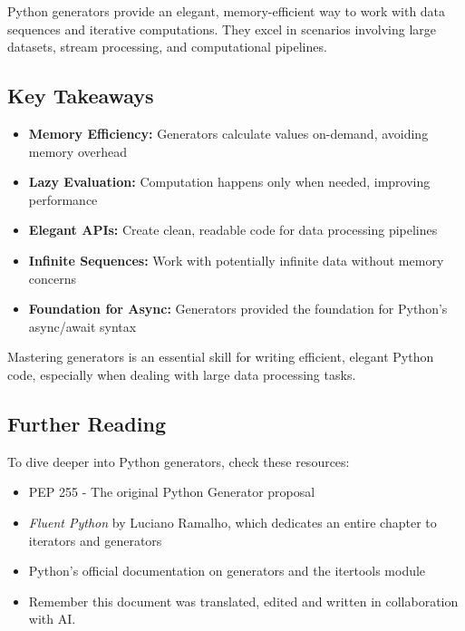 \documentclass[12pt,letterpaper]{article}
\begin{document}
Python generators provide an elegant, memory-efficient way to work with data sequences and iterative computations. They excel in scenarios involving large datasets, stream processing, and computational pipelines.

\subsection{Key Takeaways}

\begin{itemize}
    \item \textbf{\textcolor{pythonBlue}{Memory Efficiency:}} Generators calculate values on-demand, avoiding memory overhead
    \item \textbf{\textcolor{pythonBlue}{Lazy Evaluation:}} Computation happens only when needed, improving performance
    \item \textbf{\textcolor{pythonBlue}{Elegant APIs:}} Create clean, readable code for data processing pipelines
    \item \textbf{\textcolor{pythonBlue}{Infinite Sequences:}} Work with potentially infinite data without memory concerns
    \item \textbf{\textcolor{pythonBlue}{Foundation for Async:}} Generators provided the foundation for Python's async/await syntax
\end{itemize}

Mastering generators is an essential skill for writing efficient, elegant Python code, especially when dealing with large data processing tasks.

\subsection{Further Reading}

To dive deeper into Python generators, check these resources:
\begin{itemize}
    \item PEP 255 - The original Python Generator proposal
    \item \textit{Fluent Python} by Luciano Ramalho, which dedicates an entire chapter to iterators and generators
    \item Python's official documentation on generators and the itertools module
    \item Remember this document was translated, edited and written in collaboration with AI.
\end{itemize}
\end{document}
